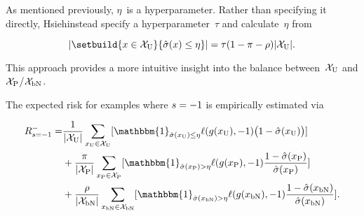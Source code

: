 As mentioned previously, $\eta$~is a hyperparameter.  Rather than specifying it directly, Hsieh\etal instead specify a hyperparameter~$\tau$ and calculate~$\eta$ from

\begin{equation}\label{eq:EtaCalculation}
\abs{\setbuild{\X \in \utrain}{\hsigX \leq \eta}} = \tau (1 - \prior - \plabel)\abs{\utrain} \text{.}
\end{equation}

\noindent
This approach provides a more intuitive insight into the balance between~$\mathcal{X}_{\textnormal{U}}$ and $\mathcal{X}_{\textnormal{P}}$/$\mathcal{X}_{\textnormal{bN}}$.

The expected risk for examples where ${s = {-}1}$ is empirically estimated via

\begin{equation}\label{eq:EmpRisk:PUbN:Latent}
  \begin{aligned}
    \smrisk = &\frac{1}{\abs{\utrain}} \sum_{\xvar{U} \in \utrain} \sbrack{\mathbbm{1}_{\hsig(\xvar{U}) \leq \eta} \floss{\dec(\xvar{U})}{\ncls} \big(1 - \hsig(\xvar{U})\big)} \\
              &+\frac{\prior}{\abs{\ptrain}} \sum_{\xvar{P} \in \ptrain} \sbrack{\mathbbm{1}_{\hsig(\xvar{P}) > \eta} \floss{\dec(\xvar{P})}{\ncls} \frac{1 - \hsig(\xvar{P})}{\hsig(\xvar{P})}} \\
              &+\frac{\plabel}{\abs{\bntrain}} \sum_{\xvar{bN} \in \bntrain} \sbrack{\mathbbm{1}_{\hsig(\xvar{bN}) > \eta} \floss{\dec(\xvar{bN})}{\ncls} \frac{1 - \hsig(\xvar{bN})}{\hsig(\xvar{bN})}} \text{.}
  \end{aligned}
\end{equation}
